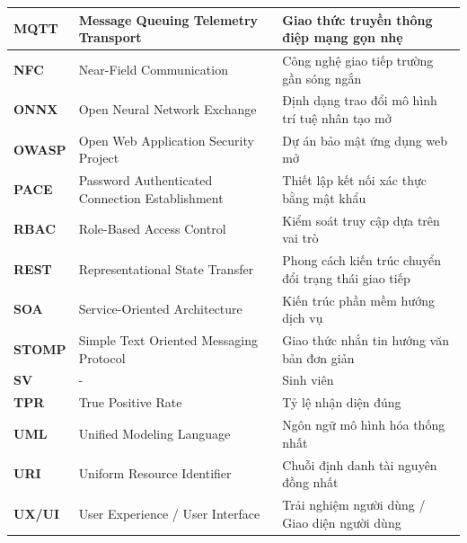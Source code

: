 \documentclass[../DoAn.tex]{subfiles}
\begin{document}
\begin{longtable}{|l|p{6.5cm}|p{6.5cm}|}
\textbf{MQTT} & Message Queuing Telemetry Transport & Giao thức truyền thông điệp mạng gọn nhẹ \\ \hline
\textbf{NFC} & Near-Field Communication & Công nghệ giao tiếp trường gần sóng ngắn \\ \hline
\textbf{ONNX} & Open Neural Network Exchange & Định dạng trao đổi mô hình trí tuệ nhân tạo mở \\ \hline
\textbf{OWASP} & Open Web Application Security Project & Dự án bảo mật ứng dụng web mở \\ \hline
\textbf{PACE} & Password Authenticated Connection Establishment & Thiết lập kết nối xác thực bằng mật khẩu \\ \hline
\textbf{RBAC} & Role-Based Access Control & Kiểm soát truy cập dựa trên vai trò \\ \hline
\textbf{REST} & Representational State Transfer & Phong cách kiến trúc chuyển đổi trạng thái giao tiếp \\ \hline
\textbf{SOA} & Service-Oriented Architecture & Kiến trúc phần mềm hướng dịch vụ \\ \hline
\textbf{STOMP} & Simple Text Oriented Messaging Protocol & Giao thức nhắn tin hướng văn bản đơn giản \\ \hline
\textbf{SV} & - & Sinh viên \\ \hline
\textbf{TPR} & True Positive Rate & Tỷ lệ nhận diện đúng \\ \hline
\textbf{UML} & Unified Modeling Language & Ngôn ngữ mô hình hóa thống nhất \\ \hline
\textbf{URI} & Uniform Resource Identifier & Chuỗi định danh tài nguyên đồng nhất \\ \hline
\textbf{UX/UI} & User Experience / User Interface & Trải nghiệm người dùng / Giao diện người dùng \\ \hline
\end{longtable}
\end{document}
